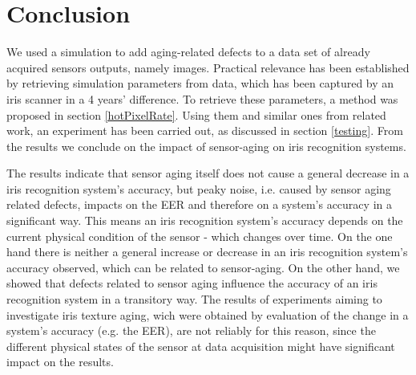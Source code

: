 \documentclass[10pt,twocolumn,letterpaper]{article}
\begin{document}
 \section{Conclusion}
 \label{conclusion}
 We used a simulation to add aging-related defects to a data set of already acquired sensors outputs, namely images. Practical relevance has been established by retrieving simulation parameters from data, which has been captured by an iris scanner in a 4 years' difference. To retrieve these parameters, a method was proposed in section \ref{hotPixelRate}. Using them and similar ones from related work, an experiment has been carried out, as discussed in section \ref{testing}. From the results we conclude on the impact of sensor-aging on iris recognition systems.
 
The results indicate that sensor aging itself does not cause a general decrease in a iris recognition system's accuracy, but peaky noise, i.e. caused by sensor aging related defects, impacts on the EER and therefore on a system's accuracy in a significant way. This means an iris recognition system's accuracy depends on the current physical condition of the sensor - which changes over time. On the one hand there is neither a general increase or decrease in an iris recognition system's accuracy observed, which can be related to sensor-aging. On the other hand, we showed that defects related to sensor aging influence the accuracy of an iris recognition system in a transitory way. The results of experiments aiming to investigate iris texture aging, wich were obtained by evaluation of the change in a system's accuracy (e.g. the EER), are not reliably for this reason, since the different physical states of the sensor at data acquisition might have significant impact on the results.  
 
 




{\small


}

\end{document}
